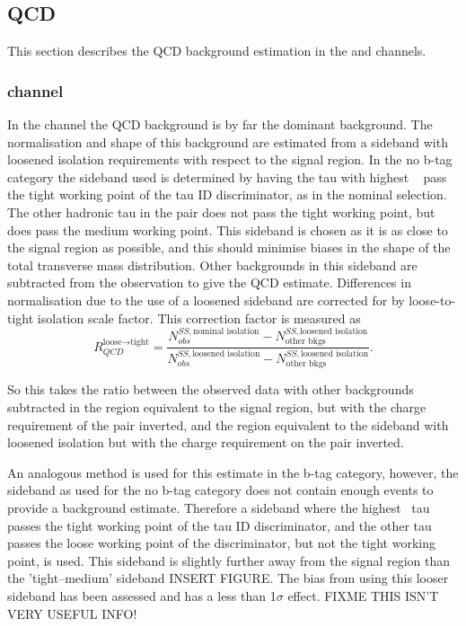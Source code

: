 \subsection{QCD}
\label{sec:mssm_bkgs_qcd}
This section describes the QCD background
estimation in the \tautau and \emu channels.

\subsubsection{\texorpdfstring{\tautau channel}{tau tau channel}}
\label{sec:mssm_bkgs_qcd_tt}
In the \tautau channel the QCD background is by far the 
dominant background. The normalisation and shape 
of this background are estimated from a sideband with loosened 
isolation requirements with respect to the signal region. 
In the no b-tag category the sideband used is determined
by having the tau with highest \pT~ pass the tight working
point of the tau ID discriminator, as in the nominal selection.
The other hadronic tau in the pair does not pass the tight working point,
but does pass the medium working point. This sideband is 
chosen as it is as close to the signal region as possible, and 
this should minimise biases in the shape of the total transverse mass
distribution. Other backgrounds
in this sideband are subtracted from the observation to give
the QCD estimate. Differences in normalisation due to
the use of a loosened sideband are corrected for by loose-to-tight isolation
scale factor. This correction factor is measured as
\begin{equation}\label{eqn:tautau_qcd}
R_{QCD}^{\text{loose}\rightarrow\text{tight}} = \frac{N_{obs}^{SS,\text{nominal isolation}}-N_{\text{other bkgs}}^{SS,\text{loosened isolation}}}{N_{obs}^{SS,\text{loosened isolation}}-N_{\text{other bkgs}}^{SS,\text{loosened isolation}}}.
\end{equation}

So this takes the ratio between the observed data with other
backgrounds subtracted in the region equivalent to the signal region, but with the
charge requirement of the pair inverted, and the region equivalent to the sideband
with loosened isolation but with the charge requirement on the pair inverted.

An analogous method is used for this estimate in the 
b-tag category, however, the sideband as used for the 
no b-tag category does not contain enough events to 
provide a background estimate. Therefore a sideband where
the highest \pT~tau passes the tight working point of the
tau ID discriminator, and the other tau passes the loose working
point of the discriminator, but not the tight working point, is used.
This sideband is slightly further away from the signal region than the
'tight--medium' sideband INSERT FIGURE. The bias from using this looser
sideband has been assessed and has a less than 1$\sigma$ effect.
FIXME THIS ISN'T VERY USEFUL INFO!

